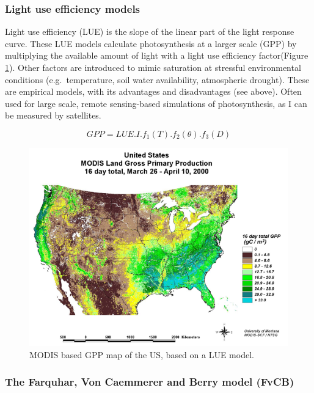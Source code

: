 \documentclass[
  12pt,
  oneside]{book}
\begin{document}
\hypertarget{light-use-efficiency-models}{%
\subsubsection{Light use efficiency models}\label{light-use-efficiency-models}}

Light use efficiency (LUE) is the slope of the linear part of the light response curve. These LUE models calculate photosynthesis at a larger scale (GPP) by multiplying the available amount of light with a light use efficiency factor(Figure \ref{fig:f26}). Other factors are introduced to mimic saturation at stressful environmental conditions (e.g.~temperature, soil water availability, atmospheric drought). These are empirical models, with its advantages and disadvantages (see above). Often used for large scale, remote sensing-based simulations of photosynthesis, as I can be measured by satellites.

\[
GPP=LUE.I.f_1(T).f_2(\theta).f_3(D)
\]

\begin{figure}

{\centering \includegraphics[width=0.8\linewidth]{figures/chap2/MODIS_GPP} 

}

\caption{MODIS based GPP map of the US, based on a LUE model.}\label{fig:f26}
\end{figure}

\hypertarget{the-farquhar-von-caemmerer-and-berry-model-fvcb}{%
\subsubsection{The Farquhar, Von Caemmerer and Berry model (FvCB)}\label{the-farquhar-von-caemmerer-and-berry-model-fvcb}}
\end{document}
